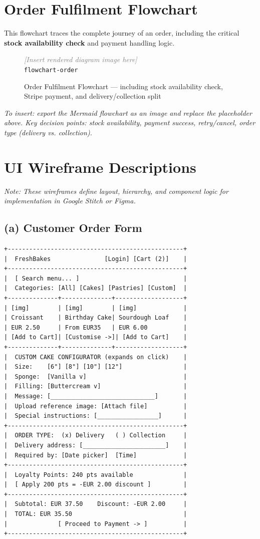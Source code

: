 \documentclass[12pt, a4paper]{report}
\newcommand{\diagramplaceholder}[2]{%
  \begin{figure}[H]
    \centering
    \begin{mdframed}[linecolor=coderule, backgroundcolor=codegray,
                     innerleftmargin=12pt, innerrightmargin=12pt,
                     innertopmargin=20pt, innerbottommargin=20pt]
      \centering
      \textit{\textcolor{gray}{[Insert rendered diagram image here]}}\\[6pt]
      \texttt{\small #1}
    \end{mdframed}
    \caption{#2}
    \label{fig:#1}
  \end{figure}
}
\begin{document}
\section{Order Fulfilment Flowchart}

This flowchart traces the complete journey of an order, including the critical
\textbf{stock availability check} and payment handling logic.

\diagramplaceholder{flowchart-order}{Order Fulfilment Flowchart --- including stock availability check, Stripe payment, and delivery/collection split}

\textit{To insert: export the Mermaid flowchart as an image and replace the
placeholder above. Key decision points: stock availability, payment success,
retry/cancel, order type (delivery vs. collection).}

\section{UI Wireframe Descriptions}

\textit{Note: These wireframes define layout, hierarchy, and component logic
for implementation in Google Stitch or Figma.}

\subsection{(a) Customer Order Form}

\begin{lstlisting}[style=wireframe]
+-------------------------------------------------+
|  FreshBakes               [Login] [Cart (2)]    |
+-------------------------------------------------+
|  [ Search menu... ]                             |
|  Categories: [All] [Cakes] [Pastries] [Custom]  |
+--------------+--------------+-------------------+
| [img]        | [img]        | [img]             |
| Croissant    | Birthday Cake| Sourdough Loaf    |
| EUR 2.50     | From EUR35   | EUR 6.00          |
| [Add to Cart]| [Customise ->]| [Add to Cart]    |
+--------------+--------------+-------------------+
|  CUSTOM CAKE CONFIGURATOR (expands on click)    |
|  Size:    [6"] [8"] [10"] [12"]                 |
|  Sponge:  [Vanilla v]                           |
|  Filling: [Buttercream v]                       |
|  Message: [_____________________________]       |
|  Upload reference image: [Attach file]          |
|  Special instructions: [_________________]      |
+-------------------------------------------------+
|  ORDER TYPE:  (x) Delivery   ( ) Collection     |
|  Delivery address: [_______________________]    |
|  Required by: [Date picker]  [Time]             |
+-------------------------------------------------+
|  Loyalty Points: 240 pts available              |
|  [ Apply 200 pts = -EUR 2.00 discount ]         |
+-------------------------------------------------+
|  Subtotal: EUR 37.50    Discount: -EUR 2.00     |
|  TOTAL: EUR 35.50                               |
|              [ Proceed to Payment -> ]          |
+-------------------------------------------------+
\end{lstlisting}
\end{document}
